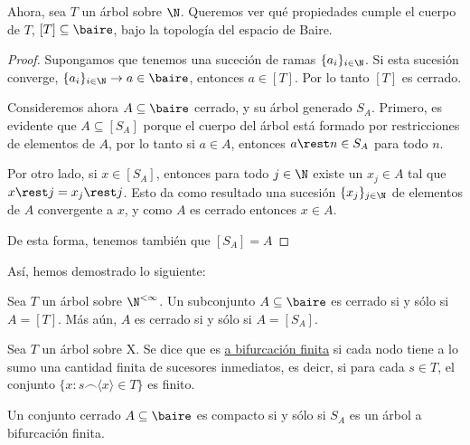 \begin{pre}
    Ahora, sea $T$ un árbol sobre $\N$. Queremos ver qué propiedades cumple el cuerpo de $T$, $[T] \subseteq \baire$, bajo la topología del espacio de Baire.
\end{pre}
 
\begin{proof}
    Supongamos que tenemos una suceción de ramas $\{ a_i \}_{i \in \N}$. Si esta sucesión converge, $\{ a_i \}_{i \in \N} \rightarrow a \in \baire$, entonces $a \in [T]$. Por lo tanto $[T]$ es cerrado.
     
    Consideremos ahora $A \subseteq \baire$ cerrado, y su árbol generado $S_A$. Primero, es evidente que $A \subseteq [S_A]$ porque el cuerpo del árbol está formado por restricciones de elementos de $A$, por lo tanto si $a \in A$, entonces $a \rest n \in S_A$ para todo $n$.
     
    Por otro lado, si $x \in [S_A]$, entonces para todo $j \in \N$ existe un $x_j \in A$ tal que $x \rest j = x_j \rest j$. Esto da como resultado una sucesión $\{x_j\}_{j \in \N}$ de elementos de $A$ convergente a $x$, y como $A$ es cerrado entonces $x \in A$.
     
    De esta forma, tenemos también que $[S_A] = A$
\end{proof}

Así, hemos demostrado lo siguiente:

\begin{teo}
    Sea $T$ un árbol sobre $\N^{< \infty}$. Un subconjunto $A \subseteq \baire$ es cerrado si y sólo si $A = [T]$. Más aún, $A$ es cerrado si y sólo si $A = [S_A]$.
\end{teo}

\begin{defn}
    Sea $T$ un árbol sobre X. Se dice que es \ul{a bifurcación finita} si cada nodo tiene a lo sumo una cantidad finita de sucesores inmediatos, es deicr, si para cada $s \in T$, el conjunto $\{ x : s \frown \langle x \rangle \in T \}$ es finito.
\end{defn}

\begin{teo}
    Un conjunto cerrado $A \subseteq \baire$ es compacto si y sólo si $S_A$ es un árbol a bifurcación finita.
\end{teo}

